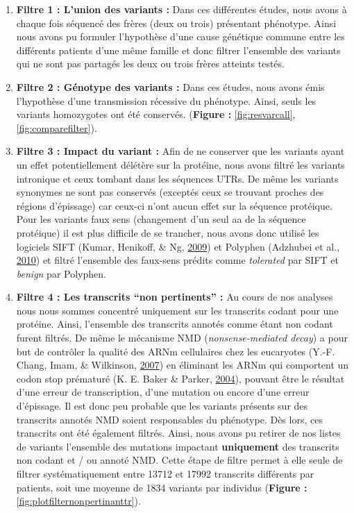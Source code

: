 \documentclass[12pt,twoside]{reedthesis}
\providecommand{\tightlist}{%
  \setlength{\itemsep}{0pt}\setlength{\parskip}{0pt}}
\theoremstyle{definition}
\theoremstyle{definition}
\theoremstyle{remark}
\begin{document}
  \begin{enumerate}
  \def\labelenumi{\arabic{enumi}.}
  \tightlist
  \item
    \textbf{Filtre 1 : L'union des variants :} Dans ces différentes
    études, nous avons à chaque fois séquencé des frères (deux ou trois)
    présentant phénotype. Ainsi nous avons pu formuler l'hypothèse d'une
    cause génétique commune entre les différents patients d'une même
    famille et donc filtrer l'ensemble des variants qui ne sont pas
    partagés les deux ou trois frères atteints testés.\\
  \item
    \textbf{Filtre 2 : Génotype des variants :} Dans ces études, nous
    avons émis l'hypothèse d'une transmission récessive du phénotype.
    Ainsi, seuls les variants homozygotes ont été conservés.
    (\textbf{Figure : }\ref{fig:resvarcall}, \ref{fig:comparefilter}).\\
  \item
    \textbf{Filtre 3 : Impact du variant :} Afin de ne conserver que les
    variants ayant un effet potentiellement délétère sur la protéine, nous
    avons filtré les variants intronique et ceux tombant dans les
    séquences UTRs. De même les variants synonymes ne sont pas conservés
    (exceptés ceux se trouvant proches des régions d'épissage) car ceux-ci
    n'ont aucun effet sur la séquence protéique. Pour les variants faux
    sens (changement d'un seul aa de la séquence protéique) il est plus
    difficile de se trancher, nous avons donc utilisé les logiciels SIFT
    (Kumar, Henikoff, \& Ng, \protect\hyperlink{ref-Kumar2009}{2009}) et
    Polyphen (Adzhubei et al., \protect\hyperlink{ref-Adzhubei2010}{2010})
    et filtré l'ensemble des faux-sens prédits comme \emph{tolerated} par
    SIFT et \emph{benign} par Polyphen.\\
  \item
    \textbf{Filtre 4 : Les transcrits ``non pertinents'' :} Au cours de
    nos analyses nous nous sommes concentré uniquement sur les transcrits
    codant pour une protéine. Ainsi, l'ensemble des transcrits annotés
    comme étant non codant furent filtrés. De même le mécanisme NMD
    (\emph{nonsense-mediated decay}) a pour but de contrôler la qualité
    des ARNm cellulaires chez les eucaryotes (Y.-F. Chang, Imam, \&
    Wilkinson, \protect\hyperlink{ref-Chang2007}{2007}) en éliminant les
    ARNm qui comportent un codon stop prématuré (K. E. Baker \& Parker,
    \protect\hyperlink{ref-Baker2004}{2004}), pouvant être le résultat
    d'une erreur de transcription, d'une mutation ou encore d'une erreur
    d'épissage. Il est donc peu probable que les variants présents sur des
    transcrits annotés NMD soient responsables du phénotype. Dès lors, ces
    transcrits ont été également filtrés. Ainsi, nous avons pu retirer de
    nos listes de variants l'ensemble des mutations impactant
    \textbf{uniquement} des transcrits non codant et / ou annoté NMD.
    Cette étape de filtre permet à elle seule de filtrer systématiquement
    entre 13712 et 17992 transcrits différents par patients, soit une
    moyenne de 1834 variants par individus (\textbf{Figure :
    }\ref{fig:plotfilternonpertinanttr}).
  \end{enumerate}
  
\end{document}
